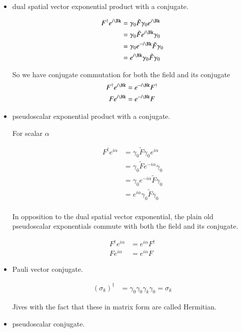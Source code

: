 \begin{itemize}
\item dual spatial vector exponential product with a conjugate.

\begin{align*}
F^\dagger  e^{i\Bk} 
&= \gamma_0 \tilde{F} \gamma_0 e^{i\Bk} \\
&= \gamma_0 \tilde{F} e^{i\Bk} \gamma_0 \\
&= \gamma_0 e^{-i\Bk} \tilde{F} \gamma_0 \\
&= e^{i\Bk} \gamma_0 \tilde{F} \gamma_0 \\
\end{align*}

So we have conjugate commutation for both the field and its conjugate
\begin{align}
F^\dagger e^{i\Bk} &= e^{-i\Bk} F^\dagger \\
F e^{i\Bk} &= e^{-i\Bk} F
\end{align}

\item pseudoscalar exponential product with a conjugate.

For scalar $\alpha$

\begin{align*}
F^\dagger  e^{i\alpha} 
&= \gamma_0 \tilde{F} \gamma_0 e^{i\alpha} \\
&= \gamma_0 \tilde{F} e^{-i\alpha} \gamma_0 \\
&= \gamma_0 e^{-i\alpha} \tilde{F} \gamma_0 \\
&= e^{i\alpha} \gamma_0 \tilde{F} \gamma_0 \\
\end{align*}

In opposition to the dual spatial vector exponential, the plain old pseudoscalar exponentials commute with 
both the field and its conjugate.

\begin{align}
F^\dagger e^{i\alpha} &= e^{i\alpha} F^\dagger \\
F e^{i\alpha} &= e^{i\alpha} F
\end{align}

\item Pauli vector conjugate.

\begin{align}
(\sigma_k)^\dagger &= \gamma_0 \gamma_0 \gamma_k \gamma_0 = \sigma_k
\end{align}

Jives with the fact that these in matrix form are called Hermitian.

\item pseudoscalar conjugate.


\end{itemize}
